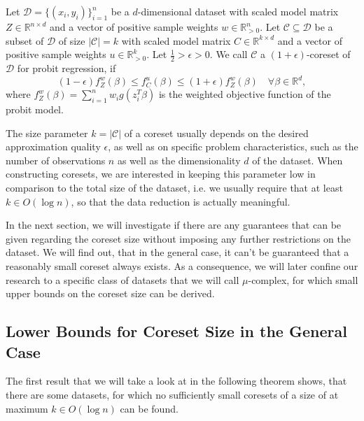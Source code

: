 \begin{definition}[Coreset]
    \label{def:coreset}
    Let $\mathcal{D}=\{(x_i, y_i)\}_{i=1}^n$ be a $d$-dimensional dataset
    with scaled model matrix $Z \in \mathbb{R}^{n \times d}$ and
    a vector of positive sample weights $w \in \mathbb{R}_{>0}^n$.
    Let $\mathcal{C} \subseteq \mathcal{D}$ be a subset of $\mathcal{D}$
    of size $|\mathcal{C}| = k$
    with scaled model matrix $C \in \mathbb{R}^{k \times d}$ and
    a vector of positive sample weights $u \in \mathbb{R}_{>0}^k$.
    Let $\frac{1}{2} > \epsilon > 0$.
    We call $\mathcal{C}$ a $(1+\epsilon)$-coreset of $\mathcal{D}$
    for probit regression, if
    \begin{equation*}
        (1-\epsilon)f_Z^w(\beta) \leq f_C^u(\beta) \leq (1+\epsilon)f_Z^w(\beta)
        \quad \forall \beta \in \mathbb{R}^d,
    \end{equation*}
    where $f_Z^w(\beta) = \sum_{i=1}^n w_i g(z_i^T \beta)$ is the
    weighted objective function of the probit model.
\end{definition}

The size parameter $k = |\mathcal{C}|$ of a coreset usually depends
on the desired approximation quality $\epsilon$, as well as on
specific problem characteristics, such as the number of observations
$n$ as well as the dimensionality $d$ of the dataset.
When constructing coresets, we are interested in keeping this parameter
low in comparison to the total size of the dataset, i.e. we
usually require that at least $k \in O(\log{n})$, so that
the data reduction is actually meaningful.

In the next section, we will investigate if there are any
guarantees that can be given regarding the coreset size
without imposing any further restrictions on the dataset.
We will find out, that in the general case, it can't
be guaranteed that a reasonably small coreset always exists.
As a consequence, we will later confine our research to a
specific class of datasets that we will call $\mu$-complex,
for which small upper bounds on the coreset size can be
derived.

\subsection{Lower Bounds for Coreset Size in the General Case}

The first result that we will take a look at in the following
theorem shows, that there are some datasets, for which
no sufficiently small coresets of a size of at maximum $k \in O(\log n)$
can be found.

